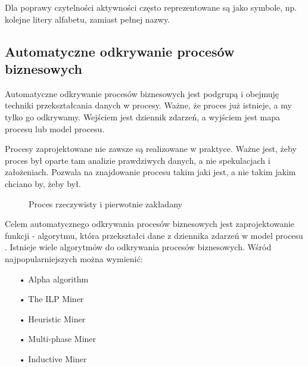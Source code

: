 Dla poprawy czytelności aktywności często reprezentowane są jako symbole, np. kolejne litery alfabetu, zamiast pełnej nazwy.

\subsection{Automatyczne odkrywanie procesów biznesowych}

Automatyczne odkrywanie procesów biznesowych jest podgrupą i obejmuję techniki przekształcania danych w procesy. Ważne, że proces już istnieje, a my tylko go odkrywamy. Wejściem jest dziennik zdarzeń, a wyjściem jest mapa procesu lub model procesu.

Procesy zaprojektowane nie zawsze są realizowane w praktyce. Ważne jest, żeby proces był oparte tam analizie prawdziwych danych, a nie spekulacjach i założeniach. Pozwala na znajdowanie procesu takim jaki jest, a nie takim jakim chciano by, żeby był.

\begin{figure}[h]
	\caption{\label{fig:subcaption_example}Proces rzeczywisty i pierwotnie zakładany}
\end{figure}

Celem automatycznego odkrywania procesów biznesowych jest zaprojektowanie funkcji - algorytmu, która przekształci dane z dziennika zdarzeń w model procesu \cite{pm-book}. Istnieje wiele algorytmów do odkrywania procesów biznesowych. Wśród najpopularniejszych można wymienić:
\begin{itemize}
  \item[•] Alpha algorithm \cite{alpha-algorithm}
  \item[•] The ILP Miner \cite{ILP-miner}
  \item[•] Heuristic Miner \cite{heuristics-miner}
  \item[•] Multi-phase Miner \cite{multi-phase-miner}
  \item[•] Inductive Miner \cite{inductive-miner}
\end{itemize}

